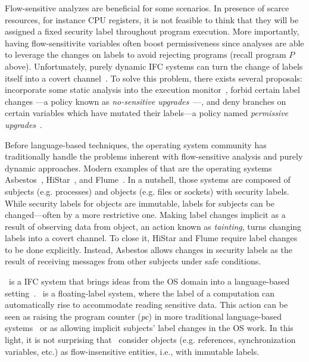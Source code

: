 
Flow-sensitive analyzes are beneficial for some scenarios. In presence of scarce
resources, for instance CPU registers, it is not feasible to think that they
will be assigned a fixed security label throughout program execution. More
importantly, having flow-sensitivite variables often boost permissiveness since
analyses are able to leverage the changes on labels to avoid rejecting programs
(recall program $P$ above). Unfortunately, purely dynamic IFC systems can turn
the change of labels itself into a covert channel~\citep{Russo:2010}. To solve
this problem, there exists several proposals: incorporate some static analysis
into the execution monitor~\citep{Russo:2010}, forbid certain label changes ---a
policy known as \emph{no-sensitive upgrades}~\citep{Austin:Flanagan:PLAS10}---,
and deny branches on certain variables which have mutated their labels---a
policy named \emph{permissive upgrades}~\citep{Austin:Flanagan:PLAS10}. 

Before language-based techniques, the operating system community has
traditionally handle the problems inherent with flow-sensitive analysis and
purely dynamic approaches. Modern examples of that are the operating systems
Asbestos~\citep{Efstathopoulos:2005}, HiStar~\citep{zeldovich:histar}, and
Flume~\citep{krohn:flume}. In a nutshell, those systems are composed of subjects
(e.g. processes) and objects (e.g. files or sockets) with security labels. While
security labels for objects are immutable, labels for subjects can be
changed---often by a more restrictive one. Making label changes implicit as a
result of observing data from object, an action known as \emph{tainting}, turns
changing labels into a covert channel. To close it, HiStar and Flume require
label changes to be done explicitly. Instead, Asbestos allows changes in 
security labels as the result of receiving messages from other subjects  
under safe conditions.

\LIO~is a IFC system that brings ideas from the OS domain into a language-based
setting~\citep{stefan:lio,stefan:addressing-covert}.  \LIO~is a floating-label
system, where the label of a computation can automatically rise to accommodate
reading sensitive data. This action can be seen as raising the program counter
(\emph{pc}) in more traditional language-based
systems~\citep{sabelfeld:language-based-iflow} or as allowing implicit subjects'
label changes in the OS work. In this light, it is not surprising that
\LIO~consider objects (e.g. references, synchronization variables, etc.) as
flow-insensitive entities, i.e., with immutable labels.







